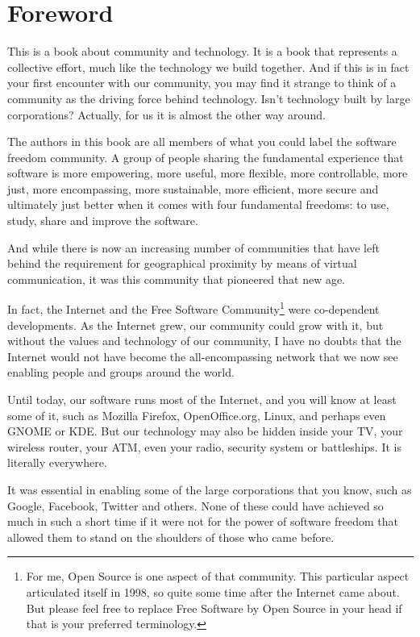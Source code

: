 \section*{Foreword}

This is a book about community and technology. It is a book that
represents a collective effort, much like the technology we build
together. And if this is in fact your first encounter with our
community, you may find it strange to think of a community as the
driving force behind technology. Isn't technology built by large
corporations? Actually, for us it is almost the other way around.

The authors in this book are all members of what you could label the
software freedom community. A group of people sharing the fundamental
experience that software is more empowering, more useful, more
flexible, more controllable, more just, more encompassing, more
sustainable, more efficient, more secure and ultimately just better
when it comes with four fundamental freedoms: to use, study, share and
improve the software.

And while there is now an increasing number of communities that have left
behind the requirement for geographical proximity by means of virtual
communication, it was this community that pioneered that new age. 

In fact, the Internet and the Free Software Community\footnote{For me,
  Open Source is one aspect of that community. This particular aspect
  articulated itself in 1998, so quite some time after the Internet
  came about. But please feel free to replace Free Software by Open
  Source in your head if that is your preferred terminology.}  were
co-dependent developments. As the Internet grew, our community could
grow with it, but without the values and technology of our community,
I have no doubts that the Internet would not have become the
all-encompassing network that we now see enabling people and groups
around the world.

Until today, our software runs most of the Internet, and you will know
at least some of it, such as Mozilla Firefox,
OpenOffice.org, Linux, and perhaps even GNOME or KDE. But our
technology may also be hidden inside your TV, your wireless
router, your ATM, even your radio, security system or battleships. It
is literally everywhere. 

It was essential in enabling some of the large corporations
that you know, such as Google, Facebook, Twitter and others. None of
these could have achieved so much in such a short time if it were not
for the power of software freedom that allowed them to stand on the
shoulders of those who came before.

